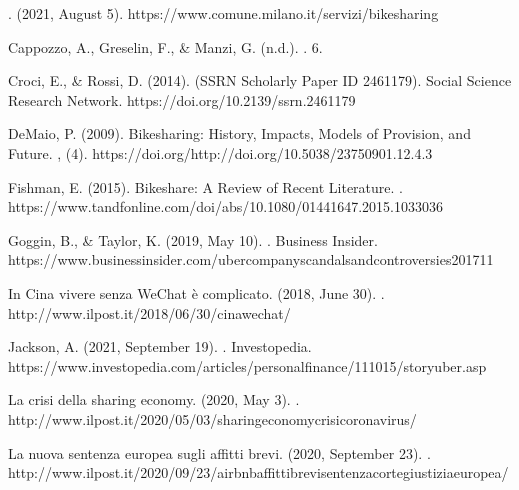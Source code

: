 \documentclass[letterpaper,10pt,english]{jupyterBook}
\begin{document}
\sphinxAtStartPar
{}. (2021, August 5). https://www.comune.milano.it/servizi/bike\sphinxhyphen{}sharing

\sphinxAtStartPar
Cappozzo, A., Greselin, F., \& Manzi, G. (n.d.). . 6.

\sphinxAtStartPar
Croci, E., \& Rossi, D. (2014).  (SSRN Scholarly Paper ID 2461179). Social Science Research Network. https://doi.org/10.2139/ssrn.2461179

\sphinxAtStartPar
DeMaio, P. (2009). Bike\sphinxhyphen{}sharing: History, Impacts, Models of Provision, and Future. , (4). https://doi.org/http://doi.org/10.5038/2375\sphinxhyphen{}0901.12.4.3

\sphinxAtStartPar
Fishman, E. (2015). Bikeshare: A Review of Recent Literature. . https://www.tandfonline.com/doi/abs/10.1080/01441647.2015.1033036

\sphinxAtStartPar
Goggin, B., \& Taylor, K. (2019, May 10). . Business Insider. https://www.businessinsider.com/uber\sphinxhyphen{}company\sphinxhyphen{}scandals\sphinxhyphen{}and\sphinxhyphen{}controversies\sphinxhyphen{}2017\sphinxhyphen{}11

\sphinxAtStartPar
In Cina vivere senza WeChat è complicato. (2018, June 30). . http://www.ilpost.it/2018/06/30/cina\sphinxhyphen{}wechat/

\sphinxAtStartPar
Jackson, A. (2021, September 19). . Investopedia. https://www.investopedia.com/articles/personal\sphinxhyphen{}finance/111015/story\sphinxhyphen{}uber.asp

\sphinxAtStartPar
La crisi della sharing economy. (2020, May 3). . http://www.ilpost.it/2020/05/03/sharing\sphinxhyphen{}economy\sphinxhyphen{}crisi\sphinxhyphen{}coronavirus/

\sphinxAtStartPar
La nuova sentenza europea sugli affitti brevi. (2020, September 23). . http://www.ilpost.it/2020/09/23/airbnb\sphinxhyphen{}affitti\sphinxhyphen{}brevi\sphinxhyphen{}sentenza\sphinxhyphen{}corte\sphinxhyphen{}giustizia\sphinxhyphen{}europea/
\end{document}
